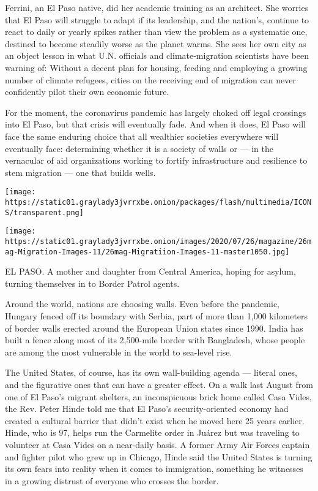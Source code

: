 Ferrini, an El Paso native, did her academic training as an architect.
She worries that El Paso will struggle to adapt if its leadership, and
the nation's, continue to react to daily or yearly spikes rather than
view the problem as a systematic one, destined to become steadily worse
as the planet warms. She sees her own city as an object lesson in what
U.N. officials and climate-migration scientists have been warning of:
Without a decent plan for housing, feeding and employing a growing
number of climate refugees, cities on the receiving end of migration can
never confidently pilot their own economic future.

For the moment, the coronavirus pandemic has largely choked off legal
crossings into El Paso, but that crisis will eventually fade. And when
it does, El Paso will face the same enduring choice that all wealthier
societies everywhere will eventually face: determining whether it is a
society of walls or --- in the vernacular of aid organizations working
to fortify infrastructure and resilience to stem migration --- one that
builds wells.

\texttt{[image: https://static01.graylady3jvrrxbe.onion/packages/flash/multimedia/ICONS/transparent.png]}

\texttt{[image: https://static01.graylady3jvrrxbe.onion/images/2020/07/26/magazine/26mag-Migration-Images-11/26mag-Migratiion-Images-11-master1050.jpg]}

EL PASO. A mother and daughter from Central America, hoping for asylum,
turning themselves in to Border Patrol agents.

Around the world, nations are choosing walls. Even before the pandemic,
Hungary fenced off its boundary with Serbia, part of more than 1,000
kilometers of border walls erected around the European Union states
since 1990. India has built a fence along most of its 2,500-mile border
with Bangladesh, whose people are among the most vulnerable in the world
to sea-level rise.

The United States, of course, has its own wall-building agenda ---
literal ones, and the figurative ones that can have a greater effect. On
a walk last August from one of El Paso's migrant shelters, an
inconspicuous brick home called Casa Vides, the Rev. Peter Hinde told me
that El Paso's security-oriented economy had created a cultural barrier
that didn't exist when he moved here 25 years earlier. Hinde, who is 97,
helps run the Carmelite order in Juárez but was traveling to volunteer
at Casa Vides on a near-daily basis. A former Army Air Forces captain
and fighter pilot who grew up in Chicago, Hinde said the United States
is turning its own fears into reality when it comes to immigration,
something he witnesses in a growing distrust of everyone who crosses the
border.


